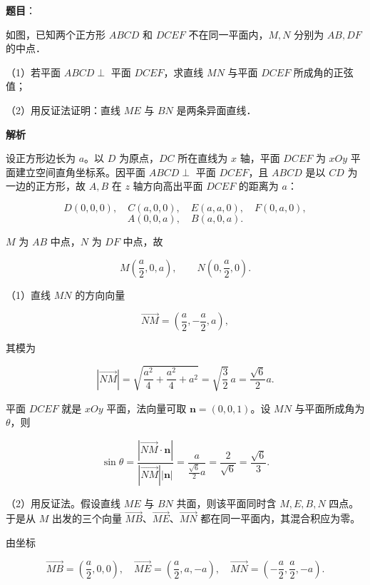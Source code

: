 \begin{answer}

\textbf{题目}：

如图，已知两个正方形 $ABCD$ 和 $DCEF$ 不在同一平面内，$M,N$ 分别为 $AB,DF$ 的中点．

（1）若平面 $ABCD\perp$ 平面 $DCEF$，求直线 $MN$ 与平面 $DCEF$ 所成角的正弦值；

（2）用反证法证明：直线 $ME$ 与 $BN$ 是两条异面直线．
\nopagebreak[4]
\begin{center}\end{center}
\nopagebreak[4]
\textbf{解析}

设正方形边长为 $a$。以 $D$ 为原点，$DC$ 所在直线为 $x$ 轴，平面 $DCEF$ 为 $xOy$ 平面建立空间直角坐标系。因平面 $ABCD\perp$ 平面 $DCEF$，且 $ABCD$ 是以 $CD$ 为一边的正方形，故 $A,B$ 在 $z$ 轴方向高出平面 $DCEF$ 的距离为 $a$：

\nopagebreak[4]
\[D(0,0,0),\quad C(a,0,0),\quad E(a,a,0),\quad F(0,a,0),\]
\nopagebreak[4]
\[A(0,0,a),\quad B(a,0,a).\]

$M$ 为 $AB$ 中点，$N$ 为 $DF$ 中点，故

\nopagebreak[4]
\[M\left(\frac a2,0,a\right),\qquad N\left(0,\frac a2,0\right).\]

（1）直线 $MN$ 的方向向量

\nopagebreak[4]
\[\overrightarrow{NM}=\left(\frac a2,-\frac a2,a\right),\]

其模为

\nopagebreak[4]
\[|\overrightarrow{NM}|
=\sqrt{\frac{a^2}{4}+\frac{a^2}{4}+a^2}
=\sqrt{\frac32}\,a
=\frac{\sqrt6}{2}a .\]

平面 $DCEF$ 就是 $xOy$ 平面，法向量可取 $\boldsymbol n=(0,0,1)$。设 $MN$ 与平面所成角为 $\theta$，则

\nopagebreak[4]
\[\sin\theta
=\frac{|\overrightarrow{NM}\cdot\boldsymbol n|}{|\overrightarrow{NM}||\boldsymbol n|}
=\frac{a}{\frac{\sqrt6}{2}a}
=\frac{2}{\sqrt6}
=\frac{\sqrt6}{3}.\]

（2）用反证法。假设直线 $ME$ 与 $BN$ 共面，则该平面同时含 $M,E,B,N$ 四点。于是从 $M$ 出发的三个向量 $\overrightarrow{MB}$、$\overrightarrow{ME}$、$\overrightarrow{MN}$ 都在同一平面内，其混合积应为零。

由坐标

\nopagebreak[4]
\[\overrightarrow{MB}=\left(\frac a2,0,0\right),\quad
\overrightarrow{ME}=\left(\frac a2,a,-a\right),\quad
\overrightarrow{MN}=\left(-\frac a2,\frac a2,-a\right).\]


\end{answer}
